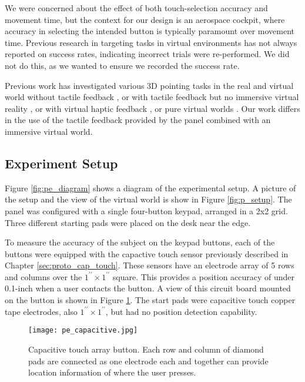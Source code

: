 We were concerned about the effect of both touch-selection accuracy and movement time, but the context for our design is an aerospace cockpit, where accuracy in selecting the intended button is typically paramount over movement time.
Previous research in targeting tasks in virtual environments has not always reported on success rates, indicating incorrect trials were re-performed.
We did not do this, as we wanted to ensure we recorded the success rate.

Previous work has investigated various 3D pointing tasks in the real and virtual world without tactile feedback \citep{liu_comparing_2009}, or with tactile feedback but no immersive virtual reality \citep{teather_evaluating_2010}, or with virtual haptic feedback \citep{chun_evaluating_2004}, or pure virtual worlds \citep{bruder_touch_2013,grossman_pointing_2004}.
Our work differs in the use of the tactile feedback provided by the panel combined with an immersive virtual world.

\subsection{Experiment Setup}

Figure \ref{fig:pe_diagram} shows a diagram of the experimental setup.
A picture of the setup and the view of the virtual world is show in Figure \ref{fig:p_setup}.
The panel was configured with a single four-button keypad, arranged in a 2x2 grid.
Three different starting pads were placed on the desk near the edge.

To measure the accuracy of the subject on the keypad buttons, each of the buttons were equipped with the capactive touch sensor previously described in Chapter \ref{sec:proto_cap_touch}.
These sensors have an electrode array of 5 rows and columns over the $1^{\prime\prime} \times 1^{\prime\prime}$ square.
This provides a position accuracy of under 0.1-inch when a user contacts the button.
A view of this circuit board mounted on the button is shown in Figure \ref{fig:pe_capacitive}.
The start pads were capacitive touch copper tape electrodes, also $1^{\prime\prime} \times 1^{\prime\prime}$, but had no position detection capability.

\begin{figure}
    \centering
    \texttt{[image: pe\_capacitive.jpg]}
    \caption{Capacitive touch array button. Each row and column of diamond pads are connected as one electrode each and together can provide location information of where the user presses.}
    \label{fig:pe_capacitive}
\end{figure}

